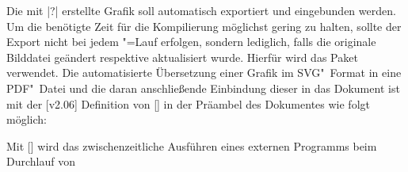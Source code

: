 Die mit |?| erstellte Grafik soll automatisch exportiert
und eingebunden werden. Um die benötigte Zeit für die Kompilierung möglichst 
gering zu halten, sollte der Export nicht bei jedem "=Lauf 
erfolgen, sondern lediglich, falls die originale Bilddatei geändert respektive 
aktualisiert wurde. Hierfür wird das Paket  verwendet. Die 
automatisierte Übersetzung einer Grafik im SVG"~Format in eine PDF"~Datei und 
die daran anschließende Einbindung dieser in das Dokument ist mit der 
[v2.06]
Definition von [] 
in der Präambel des Dokumentes wie folgt möglich:
%
\begin{Declaration*}{}
\begin{quoting}
\end{quoting}
\end{Declaration*}
%
Mit [] wird das 
zwischenzeitliche Ausführen eines externen Programms beim Durchlauf von 
